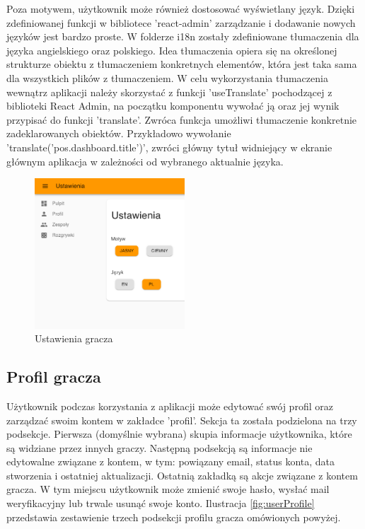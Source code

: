Poza motywem, użytkownik może również dostosować wyświetlany język. Dzięki zdefiniowanej funkcji w bibliotece 'react-admin' zarządzanie i dodawanie nowych języków jest bardzo proste. W folderze i18n zostały zdefiniowane tłumaczenia dla języka angielskiego oraz polskiego. Idea tłumaczenia opiera się na określonej strukturze obiektu z tłumaczeniem konkretnych elementów, która jest taka sama dla wszystkich plików z tłumaczeniem. W celu wykorzystania tłumaczenia wewnątrz aplikacji należy skorzystać z funkcji 'useTranslate' pochodzącej z biblioteki React Admin, na początku komponentu wywołać ją oraz jej wynik przypisać do funkcji 'translate'. Zwróca funkcja umożliwi tłumaczenie konkretnie zadeklarowanych obiektów. Przykładowo wywołanie 'translate('pos.dashboard.title')', zwróci główny tytuł widniejący w ekranie głównym aplikacja w zależności od wybranego aktualnie języka.

\begin{figure}[h!]
  \centering
    \includegraphics[width=0.5\textwidth]{images/player/settings.png}
  \caption{Ustawienia gracza}
  \label{fig:settings}
\end{figure}

\subsection{Profil gracza}

Użytkownik podczas korzystania z aplikacji może edytować swój profil oraz zarządzać swoim kontem w zakładce 'profil'. Sekcja ta została podzielona na trzy podsekcje. Pierwsza (domyślnie wybrana) skupia informacje użytkownika, które są widziane przez innych graczy. Następną podsekcją są informacje nie edytowalne związane z kontem, w tym: powiązany email, status konta, data stworzenia i ostatniej aktualizacji. Ostatnią zakładką są akcje związane z kontem gracza. W tym miejscu użytkownik może zmienić swoje hasło, wysłać mail weryfikacyjny lub trwale usunąć swoje konto. Ilustracja \ref{fig:userProfile} przedstawia zestawienie trzech podsekcji profilu gracza omówionych powyżej.

